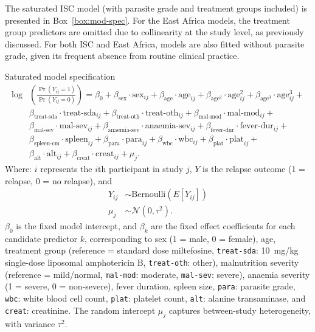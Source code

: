 The saturated ISC model (with parasite grade and treatment groups included) is presented in Box~\ref{box:mod-spec}. For the East Africa models, the treatment group predictors are omitted due to collinearity at the study level, as previously discussed. For both ISC and East Africa, models are also fitted without parasite grade, given its frequent absence from routine clinical practice.

\begin{mybox}[floatplacement=tb, label=box:mod-spec]{Saturated model specification}
  \begin{align*}
    \log & \left(\frac{\Pr(Y_{ij} =1)}{\Pr(Y_{ij}=0)}\right) = \beta_0 +
    \beta_{\text{sex}}\cdot\text{sex}_{ij} +
    \beta_{\text{age}}\cdot\text{age}_{ij} +
    \beta_{\text{age}^{2}}\cdot\text{age}_{ij}^2 +
    \beta_{\text{age}^{3}}\cdot\text{age}_{ij}^3 +                       \\
         & \beta_{\text{treat-sda}}\cdot\text{treat-sda}_{ij} +
    \beta_{\text{treat-oth}}\cdot\text{treat-oth}_{ij} +
    \beta_{\text{mal-mod}}\cdot\text{mal-mod}_{ij} +                     \\
         & \beta_{\text{mal-sev}}\cdot\text{mal-sev}_{ij} +
    \beta_{\text{anaemia-sev}}\cdot\text{anaemia-sev}_{ij} +
    \beta_{\text{fever-dur}}\cdot\text{fever-dur}_{ij} +                 \\
         & \beta_{\text{spleen-cm}}\cdot\text{spleen}_{ij} +
    \beta_{\text{para}}\cdot\text{para}_{ij} +
    \beta_{\text{wbc}}\cdot\text{wbc}_{ij} +
    \beta_{\text{plat}}\cdot\text{plat}_{ij} +                           \\
         & \beta_{\text{alt}}\cdot\text{alt}_{ij} +
    \beta_{\text{creat}}\cdot\text{creat}_{ij} + \mu_j.
  \end{align*}
  \tcbline
  Where: $i$ represents the $i$th participant in study $j$, $Y$ is the relapse outcome (1 = relapse, 0 = no relapse), and
  \begin{align*}
    Y_{ij} & \sim \text{Bernoulli}(E[Y_{ij}]) \\
    \mu_j  & \sim \mathcal{N}(0, \tau^2).
  \end{align*}
  $\beta_0$ is the fixed model intercept, and $\beta_{k}$ are the fixed effect coefficients for each candidate predictor $k$, corresponding to sex (1 = male, 0 = female), age, treatment group (reference = standard dose miltefosine, \texttt{treat-sda}: 10~mg/kg single-dose liposomal amphotericin B, \texttt{treat-oth}: other), malnutrition severity (reference = mild/normal, \texttt{mal-mod}: moderate, \texttt{mal-sev}: severe), anaemia severity (1 = severe, 0 = non-severe), fever duration, spleen size, \texttt{para}: parasite grade, \texttt{wbc}: white blood cell count, \texttt{plat}: platelet count, \texttt{alt}: alanine transaminase, and \texttt{creat}: creatinine. The random intercept $\mu_j$ captures between-study heterogeneity, with variance $\tau^2$.

\end{mybox}
